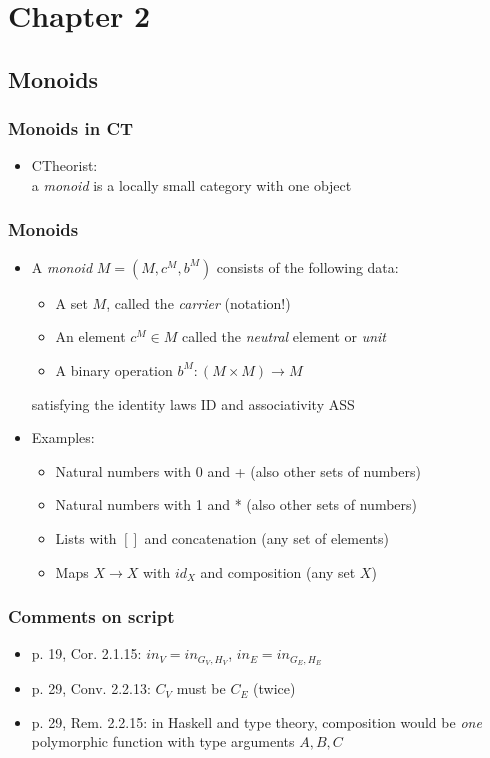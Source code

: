 \documentclass[handout]{beamer}
\begin{document}
\section{Chapter 2}
\subsection{Monoids}


\frame
  {   
    \frametitle{Monoids in CT}\label{Ch1:CTMonoid}

 \begin{itemize}[<+->]
\item CTheorist: \\a \emph{monoid} is a locally small category with one object
 \end{itemize}

 }

\frame
  {   
    \frametitle{Monoids}\label{Ch1:Monoid}

 \begin{itemize}[<+->]
\item A \emph{monoid} $M=(M,c^M,b^M)$ consists of the following data:
   \begin{itemize}[<+->]
\item A set $M$, called the \emph{carrier} (notation!)
\item An element $c^M \in M$ called the \emph{neutral} element or \emph{unit}
\item A binary operation $b^M : (M\times M) \to M$
   \end{itemize}
satisfying the identity laws ID and associativity ASS
\item Examples:   \begin{itemize}[<+->]
\item Natural numbers with 0 and + (also other sets of numbers)
\item Natural numbers with 1 and * (also other sets of numbers)
\item Lists with $[]$ and concatenation (any set of elements)
\item Maps $X\to X$ with $id_X$ and composition (any set $X$)
   \end{itemize}
 \end{itemize}

 }


\frame
  {   
    \frametitle{Comments on script}\label{Ch1:comments}

 \begin{itemize}[<+->]
\item p. 19, Cor. 2.1.15: $in_V = in_{G_V,H_V}$, $in_E = in_{G_E,H_E}$
\item p. 29, Conv. 2.2.13: $C_V$ must be $C_E$ (twice)
\item p. 29, Rem. 2.2.15: in Haskell and type theory, composition would be
\emph{one} polymorphic function with type arguments $A,B,C$
 \end{itemize}

 }
\end{document}
